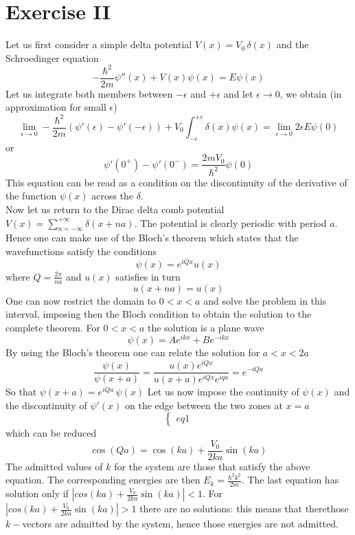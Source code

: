 \documentclass{article}
\begin{document}
\section{Exercise II}
Let us first consider a simple delta potential $V(x) = V_0 \, \delta(x)$ and the Schroedinger equation 
\begin{equation*}
    -\frac{\hbar^2}{2m}\psi''(x) + V(x) \psi(x) = E \psi(x)
\end{equation*}
Let us integrate both members between $-\epsilon$ and $+\epsilon$ and let $\epsilon \to 0$, we obtain (in approximation for small $\epsilon$)
\begin{equation*}
    \lim_{\epsilon \to 0} -\frac{\hbar^2}{2m} \left(\psi'(\epsilon) - \psi'(-\epsilon)\right) + V_0\int_{-\epsilon}^{+\epsilon} \delta(x) \psi(x) = \lim_{\epsilon \to 0} 2\epsilon E \psi(0)
\end{equation*} 
or 
\begin{equation*}
    \psi'(0^+) - \psi'(0^-) = \frac{2mV_0}{\hbar^2}\psi(0)
\end{equation*}
This equation can be read as a condition on the discontinuity of the derivative of the function $\psi(x)$ across the $\delta$. \\
Now let us return to the Dirac delta comb potential $V(x) = \sum_{n=-\infty}^{+\infty} \delta(x+na)$. The potential is clearly periodic with period $a$. Hence
one can make use of the Bloch's theorem which states that the wavefunctions satisfy the conditions
\begin{equation*}
    \psi(x) = e^{iQx} u(x)
\end{equation*}
where $Q=\frac{2\pi}{na}$ and $u(x)$ satisfies in turn
\begin{equation*}
    u(x+na) = u(x)
\end{equation*}
One can now restrict the domain to $0<x<a$ and solve the problem in this interval, imposing then the Bloch condition to obtain the solution 
to the complete theorem. For $0<x<a$ the solution is a plane wave
\begin{equation*}
    \psi(x) = Ae^{ikx} + Be^{-ikx}
\end{equation*}
By using the Bloch's theorem one can relate the solution for $a<x<2a$
\begin{equation*}
    \frac{\psi(x)}{\psi(x+a)} = \frac{u(x)e^{iQx}}{u(x+a)e^{iQx}e^{iqa}} = e^{-iQa}
\end{equation*}
So that 
$\psi(x+a) = e^{iQa} \, \psi(x)$
Let us now impose the continuity of $\psi(x)$ and the discontinuity of $\psi'(x)$ on the edge between the two zones at $x=a$
$$\begin{cases}
    eq1
\end{cases}$$
which can be reduced
\begin{equation*}
    \cos(Qa) = \cos(ka) + \frac{V_0}{2ka} \sin(ka)
\end{equation*}
The admitted values of $k$ for the system are those that satisfy the above equation. The corresponding energies are then $E_k = \frac{\hbar^2k^2}{2m}$.
The last equation has solution only if $|cos(ka) + \frac{V_0}{2ka} \sin(ka)| < 1$. 
For $|cos(ka) + \frac{V_0}{2ka} \sin(ka)| > 1$ there are no solutions: this means that therethose $k-$vectors are admitted by the system, hence those energies are not admitted.
\end{document}
